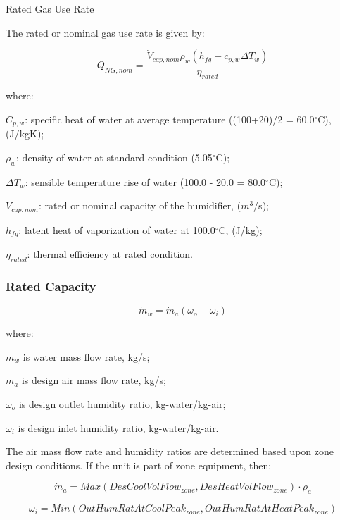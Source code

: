 Rated Gas Use Rate

The rated or nominal gas use rate is given by:

\begin{equation}
Q_{NG,nom} = \frac{\dot{V}_{cap,nom}\rho_w\left(h_{fg}+c_{p,w}\Delta T_w\right)}{\eta_{rated}}
\end{equation}

where:

\(C_{p,w}\): specific heat of water at average temperature ((100+20)/2 = 60.0\(^{\circ}\)C), (J/kgK);

\(\rho_{w}\): density of water at standard condition (5.05\(^{\circ}\)C);

\(\Delta T_{w}\): sensible temperature rise of water (100.0 - 20.0 = 80.0\(^{\circ}\)C);

\(V_{cap,nom}\): rated or nominal capacity of the humidifier, (\(m^{3}\)/s);

\(h_{fg}\): latent heat of vaporization of water at 100.0\(^{\circ}\)C, (J/kg);

\(\eta_{rated}\): thermal efficiency at rated condition.

\subsubsection{Rated Capacity}\label{rated-capacity}

\begin{equation}
{\dot m_w} = {\dot m_a}\left( {{\omega_o} - {\omega_i}} \right)
\end{equation}

where:

\({\dot m_w}\) is water mass flow rate, kg/s;

\({\dot m_a}\) is design air mass flow rate, kg/s;

\(\omega_{o}\) is design outlet humidity ratio, kg-water/kg-air;

\(\omega_{i}\) is design inlet humidity ratio, kg-water/kg-air.

The air mass flow rate and humidity ratios are determined based upon zone design conditions. If the unit is part of zone equipment, then:

\begin{equation}
{\dot m_a} = Max\left( {DesCoolVolFlo{w_{zone}},DesHeatVolFlo{w_{zone}}} \right) \cdot {\rho_a}
\end{equation}

\begin{equation}
{\omega_i} = Min\left( {OutHumRatAtCoolPea{k_{zone}},OutHumRatAtHeatPea{k_{zone}}} \right)
\end{equation}

